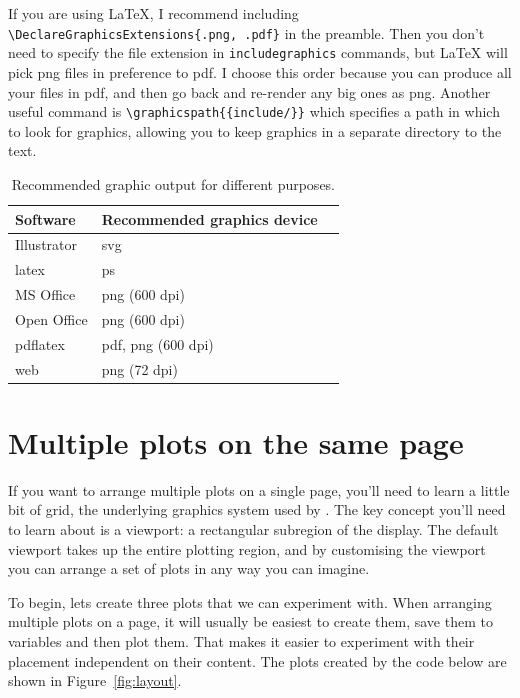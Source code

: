 If you are using \LaTeX, I recommend including \verb|\DeclareGraphicsExtensions{.png, .pdf}| in the preamble.  Then you don't need to specify the file extension in \verb|includegraphics| commands, but \LaTeX{} will pick png files in preference to pdf.  I choose this order because you can produce all your files in pdf, and then go back and re-render any big ones as png.  Another useful command is \verb|\graphicspath{{include/}}| which specifies a path in which to look for graphics, allowing you to keep graphics in a separate directory to the text.

\begin{table}
  \begin{center}
  \begin{tabular}{lll}
    \toprule
    Software & Recommended graphics device \\
    \midrule
    Illustrator & svg \\
    latex & ps \\
    MS Office & png (600 dpi) \\
    Open Office & png (600 dpi) \\
    pdflatex & pdf, png (600 dpi) \\
    web & png (72 dpi) \\
    \bottomrule 
  \end{tabular}
  \end{center}
  \caption{Recommended graphic output for different purposes.}
  \label{tbl:graphic-recommendation}
\end{table}

\section{Multiple plots on the same page}
\label{sec:grid-layout}

If you want to arrange multiple plots on a single page, you'll need to learn a little bit of grid, the underlying graphics system used by \ggplot.  The key concept you'll need to learn about is a viewport: a rectangular subregion of the display.  The default viewport takes up the entire plotting region, and by customising the viewport you can arrange a set of plots in any way you can imagine.

To begin, lets create three plots that we can experiment with.  When arranging multiple plots on a page, it will usually be easiest to create them, save them to variables and then plot them.  That makes it easier to experiment with their placement independent on their content.  The plots created by the code below are shown in Figure~\ref{fig:layout}.

